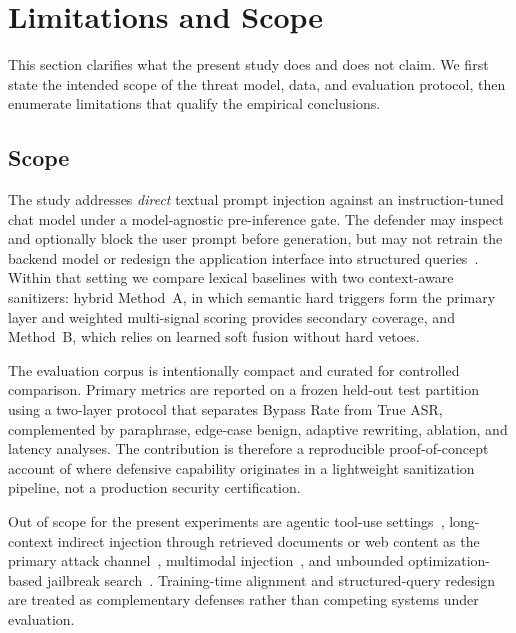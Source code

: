 
\section{Limitations and Scope}
\label{sec:limitations}

This section clarifies what the present study does and does not claim.
We first state the intended scope of the threat model, data, and evaluation protocol, then enumerate limitations that qualify the empirical conclusions.

\subsection{Scope}
\label{sec:scope}

The study addresses \emph{direct} textual prompt injection against an instruction-tuned chat model under a model-agnostic pre-inference gate.
The defender may inspect and optionally block the user prompt before generation, but may not retrain the backend model or redesign the application interface into structured queries~\cite{struq2024,secalign2024}.
Within that setting we compare lexical baselines with two context-aware sanitizers: hybrid Method~A, in which semantic hard triggers form the primary layer and weighted multi-signal scoring provides secondary coverage, and Method~B, which relies on learned soft fusion without hard vetoes.

The evaluation corpus is intentionally compact and curated for controlled comparison.
Primary metrics are reported on a frozen held-out test partition using a two-layer protocol that separates Bypass Rate from True ASR, complemented by paraphrase, edge-case benign, adaptive rewriting, ablation, and latency analyses.
The contribution is therefore a reproducible proof-of-concept account of where defensive capability originates in a lightweight sanitization pipeline, not a production security certification.

Out of scope for the present experiments are agentic tool-use settings~\cite{debenedetti2024agentdojo}, long-context indirect injection through retrieved documents or web content as the primary attack channel~\cite{greshake2023indirect,hines2024spotlighting}, multimodal injection~\cite{yeo2025multimodal}, and unbounded optimization-based jailbreak search~\cite{yi2024jailbreak}.
Training-time alignment and structured-query redesign are treated as complementary defenses rather than competing systems under evaluation.

